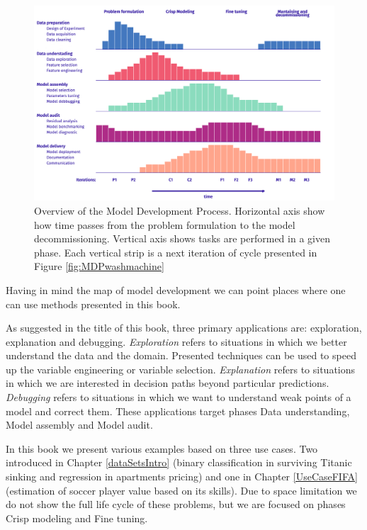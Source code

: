 \documentclass[]{krantz}
\begin{document}
\begin{figure}

{\centering \includegraphics[width=0.99\linewidth]{figure/mdp_general} 

}

\caption{Overview of the Model Development Process. Horizontal axis show how time passes from the problem formulation to the model decommissioning. Vertical axis shows tasks are performed in a given phase. Each vertical strip is a next iteration of cycle presented in Figure \ref{fig:MDPwashmachine}}\label{fig:mdpGeneral}
\end{figure}

Having in mind the map of model development we can point places where one can use methods presented in this book.

As suggested in the title of this book, three primary applications are: exploration, explanation and debugging. \emph{Exploration} refers to situations in which we better understand the data and the domain. Presented techniques can be used to speed up the variable engineering or variable selection. \emph{Explanation} refers to situations in which we are interested in decision paths beyond particular predictions. \emph{Debugging} refers to situations in which we want to understand weak points of a model and correct them. These applications target phases Data understanding, Model assembly and Model audit.

In this book we present various examples based on three use cases. Two introduced in Chapter \ref{dataSetsIntro} (binary classification in surviving Titanic sinking and regression in apartments pricing) and one in Chapter \ref{UseCaseFIFA} (estimation of soccer player value based on its skills). Due to space limitation we do not show the full life cycle of these problems, but we are focused on phases Crisp modeling and Fine tuning.
\end{document}
